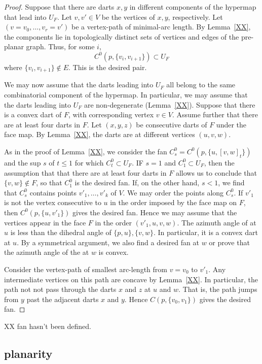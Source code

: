 \begin{proof} Suppose that there are darts $x,y$ in different components
of the hypermap that lead into $U_F$.  Let $v,v'\in V$ be the vertices of $x,y$, respectively.
Let $(v=v_0,\ldots,v_r=v')$ be a vertex-path of minimal-arc length.
By Lemma~\ref{XX},  the components
lie in topologically distinct sets of vertices and edges of the pre-planar
graph.   Thus, for some $i$,
   $$
   C^0(p,\{v_i,v_{i+1}\})\subset U_F
   $$
where $\{v_i,v_{i+1}\}\not\in E$.  This is the desired pair.

We may now assume that the darts leading into $U_F$ all belong to the same
combinatorial component of the hypermap.  In particular, we may assume that
the darts leading into $U_F$ are non-degenerate (Lemma~\ref{XX}).
Suppose that there is a convex  dart of $F$, with corresponding vertex $v\in V$.
Assume further that there are at least four darts in $F$.
Let $(x,y,z)$ be consecutive darts of $F$ under the face map.  By Lemma~\ref{XX},
the darts are at different vertices $(u,v,w)$.  


As in the proof of 
Lemma~\ref{XX}, we consider the fan $C^0_s= C^0(p,\{u,[v,w]_t\})$ and the
sup $s$ of $t\le 1$ for which $C^0_t\subset U_F$.  IF $s=1$ and $C^0_1\subset U_F$,
then the assumption that that there are at least four darts in $F$ allows us
to conclude that $\{v,w\}\not\in F$, so that $C^0_1$ is the desired fan.
If, on the other hand, $s<1$, we find that $C^0_s$ contains points
$v'_1,\ldots,v'_k$ of $V$.  We may order the points along $C^0_s$.  If
$v'_1$ is not the vertex consecutive to $u$ in the order imposed by the face map on $F$,
then $C^0(p,\{u,v'_1\})$ gives the desired fan.  Hence we may assume that
the vertices appear in the face $F$ in the order $(v'_1,u,v,w)$.  The azimuth
angle of at $u$ is less than the dihedral angle of $\{p,u\},\{v,w\}$.  In particular,
it is a convex dart at $u$.  By a symmetrical argument, we also find a desired fan at $w$
or prove that the azimuth angle of the at $w$ is convex.  

Consider the vertex-path of smallest arc-length from $v=v_0$ to $v'_1$.  Any intermediate
vertices on this path are concave by Lemma~\ref{XX}.  In particular, the path
not not pass through the darts $x$ and $z$ at $u$ and $w$.  That is, the path
jumps from $y$ past the adjacent darts $x$ and $y$.  Hence 
$C(p,\{v_0,v_1\})$ gives the desired fan.
\end{proof}

XX fan hasn't been defined.


\subsection{planarity}



